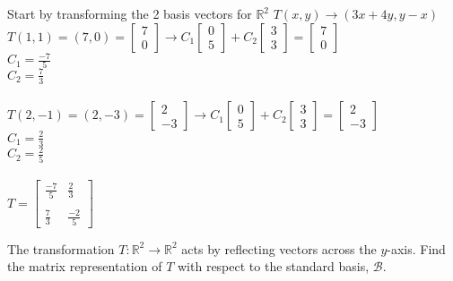 	\begin{solution}
	Start by transforming the 2 basis vectors for $\mathbb{R}^2$
		$T(x,y) \to (3x+4y, y-x)$
		\\
		$T(1,1) = (7,0) = \begin{bmatrix}7 \\ 0 \end{bmatrix} \to C_1\begin{bmatrix}0 \\ 5 \end{bmatrix} + C_2\begin{bmatrix}3 \\ 3 \end{bmatrix} = \begin{bmatrix}7 \\ 0 \end{bmatrix}$
		\\
		$C_1 = \frac{-7}{5}$
		\\
		$C_2 = \frac{7}{3}$
		\\
		\\
		$T(2,-1) = (2,-3) = \begin{bmatrix}2 \\ -3 \end{bmatrix} \to C_1\begin{bmatrix}0 \\ 5 \end{bmatrix} + C_2\begin{bmatrix}3 \\ 3 \end{bmatrix} = \begin{bmatrix}2 \\ -3 \end{bmatrix}$
		\\
		$C_1 = \frac{2}{3}$
		\\
		$C_2 = \frac{2}{5}$
		\\
		\\
		$T = \begin{bmatrix} \frac{-7}{5} & \frac{2}{3} \\ \\ \frac{7}{3} & \frac{-2}{5}\end{bmatrix}$
	\end{solution}
	
	\item The transformation $T\colon\mathbb{R}^2\to\mathbb{R}^2$ acts by reflecting vectors across the $y$-axis. Find the matrix representation of $T$ with respect to the standard basis, $\mathcal{B}$.
	
